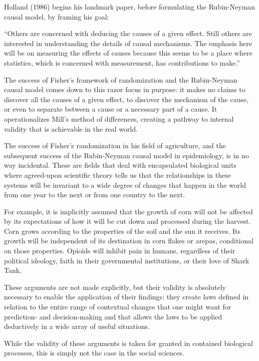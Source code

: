 \documentclass[a4paper,12pt]{article}
\begin{document}
Holland (1986) begins his landmark paper, before formulating the Rubin-Neyman causal model, by framing his goal:

\begin{displayquote}
``Others are concerned with deducing the causes of a given effect. Still others are interested in understanding the details of causal mechanisms. The emphasis here will be on measuring the effects of causes because this seems to be a place where statistics, which is concerned with measurement, has contributions to make.''
\end{displayquote}

The success of Fisher's framework of randomization and the Rubin-Neyman causal model comes down to this razor focus in purpose: it makes no claims to discover all the causes of a given effect, to discover the mechanism of the cause, or even to separate between a cause or a necessary part of a cause. It operationalizes Mill's method of differences, creating a pathway to internal validity that is achievable in the real world. 

The success of Fisher's randomization in his field of agriculture, and the subsequent success of the Rubin-Neyman causal model in epidemiology, is in no way incidental. These are fields that deal with encapsulated biological units where agreed-upon scientific theory tells us that the relationships in these systems will be invariant to a wide degree of changes that happen in the world from one year to the next or from one country to the next.

For example, it is implicitly assumed that the growth of corn will not be affected by its expectations of how it will be cut down and processed during the harvest. Corn grows according to the properties of the soil and the sun it receives. Its growth will be independent of its destination in corn flakes or arepas, conditional on those properties. Opioids will inhibit pain in humans, regardless of their political ideology, faith in their governmental institutions, or their love of Shark Tank. 

These arguments are not made explicitly, but their validity is absolutely necessary to enable the application of their findings: they create laws defined in relation to the entire range of contextual changes that one might want for prediction- and decision-making and that allows the laws to be applied deductively in a wide array of useful situations. 

While the validity of these arguments is taken for granted in contained biological processes, this is simply not the case in the social sciences. 
\end{document}
